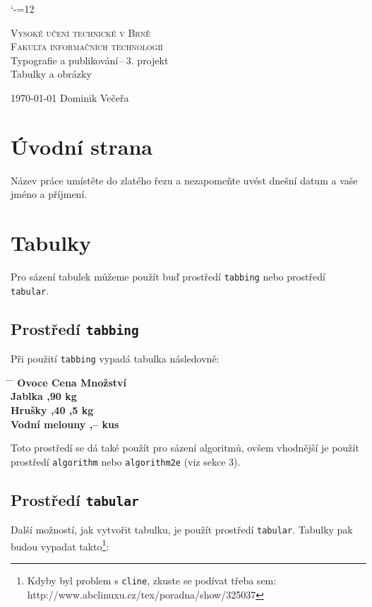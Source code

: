 \documentclass[11pt, a4paper]{article}
\begin{document}
\catcode`-=12

\begin{titlepage}
\begin{center}
\textsc{{\huge Vysoké učení technické v Brně}\\[0.7em]
{\LARGE Fakulta informačních technologií}}\\
{\Large
{}
Typografie a publikování\,--\,3. projekt}\\[0.4em]
{\huge Tabulky a obrázky}\\
\end{center}
{\Large \today \hfill
Dominik Večeřa}
\end{titlepage}

\section{Úvodní strana}
Název práce umístěte do zlatého řezu a nezapomeňte uvést dnešní datum a vaše jméno a příjmení.

\section{Tabulky}
Pro sázení tabulek můžeme použít buď prostředí \verb|tabbing| nebo prostředí \verb|tabular|.

\subsection{Prostředí \texttt{tabbing}}
Při použití \verb|tabbing| vypadá tabulka následovně:

\begin{tabbing}
    \hspace{25mm} \= \hspace{12mm} \=  \kill
    \bfseries Ovoce \>
    \bfseries Cena \>
    \bfseries Množství \\
    Jablka ,90  kg \\
    Hrušky ,40 ,5 kg\\
    Vodní melouny ,--  kus
\end{tabbing}

\noindent Toto prostředí se dá také použít pro sázení algoritmů, ovšem vhodnější je použít prostředí \verb|algorithm| nebo \verb|algorithm2e| (viz sekce 3).

\subsection{Prostředí \texttt{tabular}}
Další možností, jak vytvořit tabulku, je použít prostředí \verb|tabular|. Tabulky pak budou vypadat takto\footnote{Kdyby byl problem s \verb|cline|, zkuste se podívat třeba sem: http://www.abclinuxu.cz/tex/poradna/show/325037}:
\end{document}
